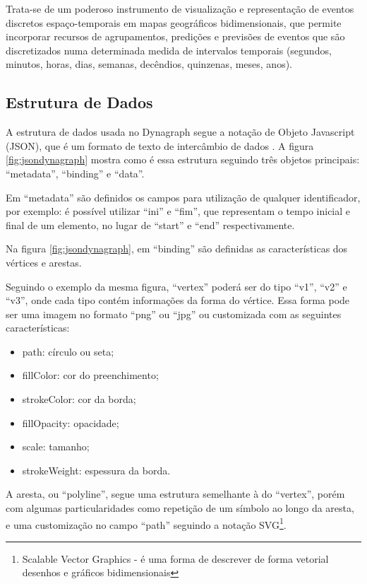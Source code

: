 Trata-se de um poderoso instrumento de visualização e representação de eventos discretos espaço-temporais em mapas geográficos bidimensionais, que permite incorporar recursos de agrupamentos, predições e previsões de eventos que são discretizados numa determinada medida de intervalos temporais (segundos, minutos, horas, dias, semanas, decêndios, quinzenas, meses, anos).

\subsection{Estrutura de Dados}

A estrutura de dados usada no Dynagraph segue a notação de Objeto Javascript (\acrfull{JSON}), que é um formato de texto de intercâmbio de dados \cite{douglas}. A figura \ref{fig:jsondynagraph} mostra como é essa estrutura seguindo três objetos principais: ``metadata'', ``binding'' e ``data''.

Em ``metadata'' são definidos os campos para utilização de qualquer identificador, por exemplo: é possível utilizar ``ini'' e ``fim'',
que representam o tempo inicial e final de um elemento, no lugar de ``start'' e ``end'' respectivamente.

Na figura \ref{fig:jsondynagraph}, em ``binding'' são definidas as características dos vértices e arestas.

Seguindo o exemplo da mesma figura, ``vertex'' poderá
ser do tipo ``v1'', ``v2'' e ``v3'', onde cada tipo contém informações da forma do vértice. Essa forma pode ser uma imagem no formato
``png'' ou ``jpg'' ou customizada com as seguintes características:
\begin{itemize}
\item path: círculo ou seta;
\item fillColor: cor do preenchimento;
\item strokeColor: cor da borda;
\item fillOpacity: opacidade;
\item scale: tamanho;
\item strokeWeight: espessura da borda.
\end{itemize}

A aresta, ou ``polyline'', segue uma estrutura semelhante à do ``vertex'', porém com algumas particularidades como repetição de um símbolo
ao longo da aresta, e uma customização no campo ``path'' seguindo a notação SVG\footnote{\label{note} Scalable Vector Graphics - é uma forma de descrever de forma vetorial desenhos e gráficos bidimensionais}.

